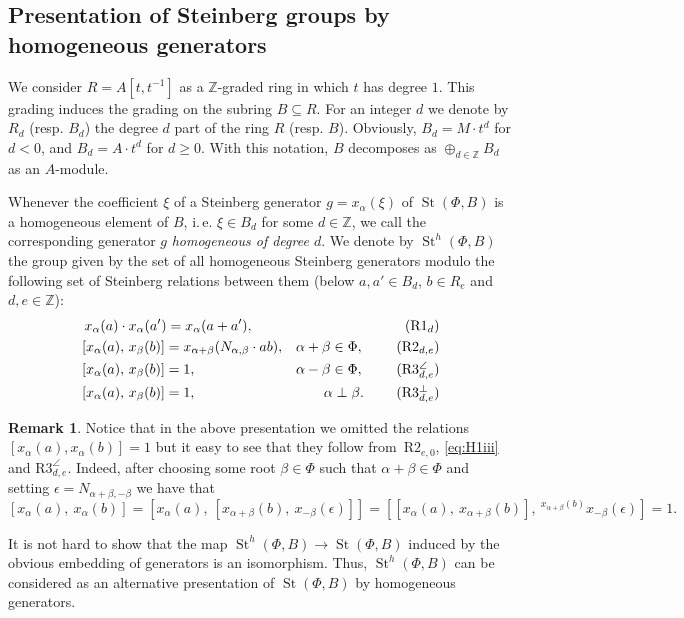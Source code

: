 \documentclass[oneside, 8pt]{amsart}
\theoremstyle{remark}
\theoremstyle{definition}
\numberwithin{lemma}{section}
\numberwithin{prop}{section}
\numberwithin{corollary}{section}
\numberwithin{externaltheorem}{section}
\newtheorem{rem}[lemma]{Remark}
\DeclareMathOperator{\St}{St}
\newcommand{\inv}{^{-1}}
\numberwithin{equation}{section}
\begin{document}
\subsection{Presentation of Steinberg groups by homogeneous generators}
\label{sec:presentation}
We consider $R = A[t, t\inv]$ as a $\mathbb{Z}$-graded ring in which $t$ has degree $1$. This grading induces the grading on the subring $B \subseteq R$. For an integer $d$ we denote by $R_d$ (resp. $B_d$) the degree $d$ part of the ring $R$ (resp. $B$). Obviously, $B_d=M \cdot t^d$ for $d<0$, and $B_d=A \cdot t^d$ for $d\geq0$. With this notation, $B$ decomposes as $\oplus_{d\in\mathbb Z}B_d$ as an $A$-module. 

Whenever the coefficient $\xi$ of a Steinberg generator $g = x_\alpha(\xi)$ of $\St(\Phi, B)$ is a homogeneous element of $B$, i.\,e. $\xi \in B_d$ for some $d \in \mathbb{Z}$,
 we call the corresponding generator $g$ {\it homogeneous of degree $d$}.
We denote by $\St^h(\Phi, B)$ the group given by the set of all homogeneous Steinberg generators modulo the following set of Steinberg relations between them
(below $a, a' \in B_d$, $b\in R_e$ and $d,e \in \mathbb{Z}$): 
\begin{align}
&\,\,x_{\alpha}(a)\cdot x_{\alpha}(a') =  x_{\alpha}(a+a'),                        & \tag{R$1_d$} \\
&\,[x_{\alpha}(a),\,x_{\beta}(b)]= x_{\alpha+\beta}(N_{\alpha, \beta} \cdot ab),   & \alpha + \beta \in \Phi,\ \tag{R$2_{d,e}$} \\
&\,[x_{\alpha}(a),\,x_{\beta}(b)]= 1,                                              & \alpha - \beta \in \Phi,\ \tag{R$3^\angle_{d,e}$} \\
&\,[x_{\alpha}(a),\,x_{\beta}(b)]= 1,                                              & \alpha \perp \beta.\ \tag{R$3^\bot_{d,e}$}
\end{align}
\begin{rem}
Notice that in the above presentation we omitted the relations $[x_\alpha(a), x_\alpha(b)] = 1$ but it easy to see that they follow from~$\text{R2}_{e,0}$, \eqref{eq:H1iii} and $\text{R3}_{d,e}^\angle$. Indeed, after choosing some root $\beta\in \Phi$ such that $\alpha+\beta\in\Phi$ and setting $\epsilon = N_{\alpha+\beta,-\beta}$ we have that \[ [x_\alpha(a),\ x_\alpha(b)] = [x_\alpha(a),\ [x_{\alpha+\beta}(b),\ x_{-\beta}(\epsilon)]] = [[x_\alpha(a),\ x_{\alpha+\beta}(b)],\ {}^{x_{\alpha+\beta}(b)}\!x_{-\beta}(\epsilon)] = 1. \]
\end{rem}

It is not hard to show that the map $\St^h(\Phi, B) \to \St(\Phi, B)$ induced by the obvious embedding of generators is an isomorphism. Thus, $\St^h(\Phi, B)$ can be considered as an alternative presentation of $\St(\Phi, B)$ by homogeneous generators.
\end{document}
